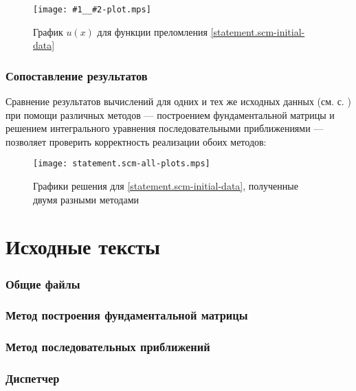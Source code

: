 \documentclass{article}
\newcommand{\includeplot}[2]{\begin{figure}[hb]
    \centering
    \texttt{[image: \#1\_\_\#2-plot.mps]}
    \caption{График $u(x)$ для функции преломления \eqref{#2-initial-data}}
\end{figure}}
\numberwithin{equation}{section}
\begin{document}


\includeplot{iterative}{statement.scm}

\clearpage
\section{Сопоставление результатов}

Сравнение результатов вычислений для одних и тех же исходных данных
(см. с. \pageref{statement.scm-initial-data}) при помощи различных
методов — построением фундаментальной матрицы и решением интегрального
уравнения последовательными приближениями — позволяет проверить
корректность реализации обоих методов:

\begin{figure}[hb]
  \centering
  \texttt{[image: statement.scm-all-plots.mps]}
  \caption{Графики решения для \eqref{statement.scm-initial-data},
    полученные двумя разными методами}
\end{figure}

\clearpage
\appendix
\part{Исходные тексты}
\section{Общие файлы}




\clearpage
\section{Метод построения  фундаментальной матрицы}



\clearpage
\section{Метод последовательных приближений}



\clearpage
\section{Диспетчер}


\end{document}
